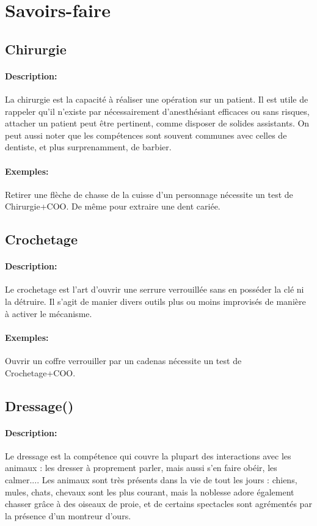 \documentclass[10pt,a4paper,twocolumn]{book}
\begin{document}
\section{Savoirs-faire}
\subsection{Chirurgie}
\paragraph{Description:}La chirurgie est la capacité à réaliser une opération sur un patient. Il est utile de rappeler qu'il n'existe par nécessairement d'anesthésiant efficaces ou sans risques, attacher un patient peut être pertinent, comme disposer de solides assistants. On peut aussi noter que les compétences sont souvent communes avec celles de dentiste, et plus surprenamment, de barbier.
\paragraph{Exemples:}Retirer une flèche de chasse de la cuisse d'un personnage nécessite un test de Chirurgie+COO. De même pour extraire une dent cariée.
\subsection{Crochetage}
\paragraph{Description:}Le crochetage est l'art d'ouvrir une serrure verrouillée sans en posséder la clé ni la détruire. Il s'agit de manier divers outils plus ou moins improvisés de manière à activer le mécanisme.
\paragraph{Exemples:}Ouvrir un coffre verrouiller par un cadenas nécessite un test de Crochetage+COO.
\subsection{Dressage()}
\paragraph{Description:}Le dressage est la compétence qui couvre la plupart des interactions avec les animaux : les dresser à proprement parler, mais aussi s'en faire obéir, les calmer.... Les animaux sont très présents dans la vie de tout les jours : chiens, mules, chats, chevaux sont les plus courant, mais la noblesse adore également chasser grâce à des oiseaux de proie, et de certains spectacles sont agrémentés par la présence d'un montreur d'ours.
\end{document}
